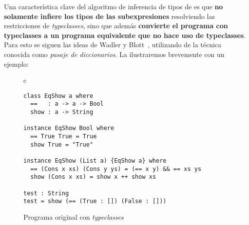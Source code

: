 Una característica clave del algoritmo de inferencia de tipos de \nuflo
es que {\bf no solamente infiere los tipos de las subexpresiones}
resolviendo las restricciones de {\em typeclasses},
sino que además {\bf convierte el programa con typeclasses a un programa
equivalente que no hace uso de typeclasses}.
Para esto se siguen las ideas de Wadler y Blott~\cite{wadler1989make},
utilizando de la técnica conocida como {\em pasaje de diccionarios}.
La ilustraremos brevemente con un ejemplo:
\begin{figure}[!htp]
\begin{center}
\begin{framed}
\begin{tabular}{c}
\begin{lstlisting}[mathescape=true,basicstyle=\footnotesize\tt]
class EqShow a where
  ==   : a -> a -> Bool
  show : a -> String

instance EqShow Bool where
  == True True = True
  show True = "True"
  
instance EqShow (List a) {EqShow a} where
  == (Cons x xs) (Cons y ys) = (== x y) && == xs ys
  show (Cons x xs) = show x ++ show xs
  
test : String
test = show (== (True : []) (False : []))
\end{lstlisting}
\end{tabular}
\caption{Programa original con {\em typeclasses}}
\end{framed}
\end{center}
\label{programa_con_typeclasses}
\end{figure}

